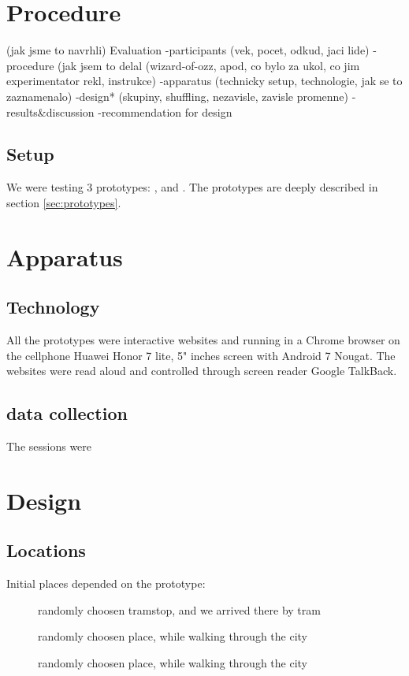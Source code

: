 	\section{Procedure}
	(jak jsme to navrhli)
	Evaluation
	-participants (vek, pocet, odkud, jaci lide)
	-procedure (jak jsem to delal (wizard-of-ozz, apod, co bylo za ukol, co jim experimentator rekl, instrukce)
	-apparatus (technicky setup, technologie, jak se to zaznamenalo)
	-design* (skupiny, shuffling, nezavisle, zavisle promenne)
	-results\&discussion
	-recommendation for design
	
	\subsection{Setup}
	We were testing 3 prototypes: \poi{}, \reversegeo{} and \gps{}. The prototypes are deeply described in section \ref{sec:prototypes}. 
	\subsection{}
	\section{Apparatus}
	\subsection{Technology}
	All the prototypes were interactive websites and running in a Chrome browser on the cellphone Huawei Honor 7 lite, 5" inches screen with Android 7 Nougat. The websites were read aloud and controlled through screen reader Google TalkBack\cite{later}.
	\subsection{data collection}
	The sessions were
	
	\section{Design}
	\subsection{Locations}
	Initial places depended on the prototype:
	\begin{description}
		\item [\poi{}] randomly choosen tramstop, and we arrived there by tram
		\item [\reversegeo{}] randomly choosen place, while walking through the city
		\item [\gps{}] randomly choosen place, while walking through the city
	\end{description}
	
